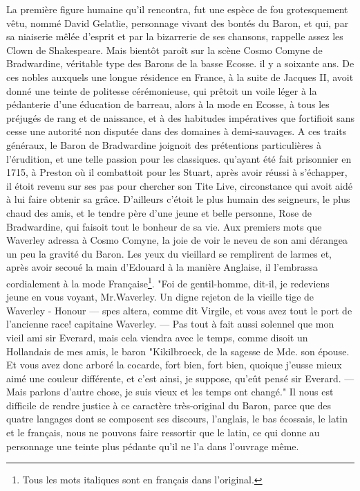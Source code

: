 La première figure humaine qu'il rencontra, fut une espèce de fou grotesquement vêtu, nommé David Gelatlie, personnage vivant des bontés du Baron, et qui, par sa niaiserie mêlée d'esprit et par la bizarrerie de ses chansons, rappelle assez les Clown de Shakespeare. Mais bientôt paroît sur la scène Cosmo Comyne de Bradwardine, véritable type des Barons de la basse Ecosse. il y a soixante ans. De ces nobles auxquels une longue résidence en France, à la suite de Jacques II, avoit donné une teinte de politesse cérémonieuse, qui prêtoit un voile léger à la pédanterie d'une éducation de barreau, alors à la mode en Ecosse, à tous les préjugés de rang et de naissance, et à des habitudes impératives que fortifioit sans cesse une autorité non disputée dans des domaines à demi-sauvages. A ces traits généraux, le Baron de Bradwardine joignoit des prétentions particulières à l'érudition, et une telle passion pour les classiques.\setcounter{page}{548} qu'ayant été fait prisonnier en 1715, à Preston où il combattoit pour les Stuart, après avoir réussi à s'échapper, il étoit revenu sur ses pas pour chercher son Tite Live, circonstance qui avoit aidé à lui faire obtenir sa grâce. D'ailleurs c'étoit le plus humain des seigneurs, le plus chaud des amis, et le tendre père d'une jeune et belle personne, Rose de Bradwardine, qui faisoit tout le bonheur de sa vie.
Aux premiers mots que Waverley adressa à Cosmo Comyne, la joie de voir le neveu de son ami dérangea un peu la gravité du Baron. Les yeux du vieillard se remplirent de larmes et, après avoir secoué la main d'Edouard à la manière Anglaise, il l'embrassa cordialement à la mode Française\footnote{Tous les mots italiques sont en français dans l'original.}. "Foi de gentil-homme, dit-il, je redeviens jeune en vous voyant, Mr.Waverley. Un digne rejeton de la vieille tige de Waverley - Honour — spes altera, comme dit Virgile, et vous avez tout le port de l'ancienne race! capitaine Waverley. — Pas tout à fait aussi solennel que mon vieil ami sir Everard, mais cela viendra avec le temps, comme disoit un Hollandais de mes amis, le baron\setcounter{page}{549} "Kikilbroeck, de la sagesse de Mde. son épouse. Et vous avez donc arboré la cocarde, fort bien, fort bien, quoique j'eusse mieux aimé une couleur différente, et c'est ainsi, je suppose, qu'eût pensé sir Everard. — Mais parlons d'autre chose, je suis vieux et les temps ont changé."
Il nous est difficile de rendre justice à ce caractère très-original du Baron, parce que des quatre langages dont se composent ses discours, l'anglais, le bas écossais, le latin et le français, nous ne pouvons faire ressortir que le latin, ce qui donne au personnage une teinte plus pédante qu'il ne l'a dans l'ouvrage même.
